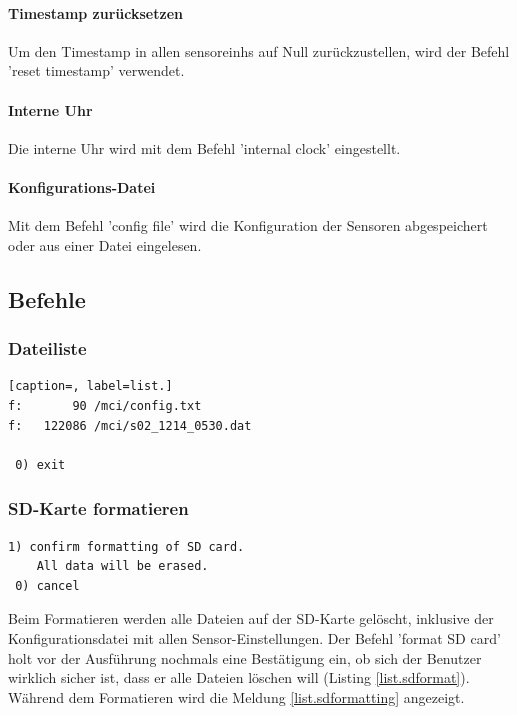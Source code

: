\paragraph{Timestamp zurücksetzen} Um den Timestamp in allen \glspl{sensoreinh} auf Null zurückzustellen, wird der Befehl 'reset timestamp' verwendet.

\paragraph{Interne Uhr} Die interne Uhr wird mit dem Befehl 'internal clock' eingestellt.

\paragraph{Konfigurations-Datei} Mit dem Befehl 'config file' wird die Konfiguration der Sensoren abgespeichert oder aus einer Datei eingelesen.

\subsection{Befehle}\label{ssec.befehle}

\subsubsection{Dateiliste}\label{sssec.listfiles}
\begin{lstlisting}[caption=, label=list.]
f:       90 /mci/config.txt
f:   122086 /mci/s02_1214_0530.dat

 0) exit
\end{lstlisting}


\subsubsection{SD-Karte formatieren}\label{sssec.sdformat}
\begin{lstlisting}[caption=Untermenü SD-Karte formatieren, label=list.sdformat]
 1) confirm formatting of SD card.
    All data will be erased.
 0) cancel
\end{lstlisting}

Beim Formatieren werden alle Dateien auf der SD-Karte gelöscht, inklusive der Konfigurationsdatei mit allen Sensor-Einstellungen. Der Befehl 'format SD card' holt vor der Ausführung nochmals eine Bestätigung ein, ob sich der Benutzer wirklich sicher ist, dass er alle Dateien löschen will (Listing \ref{list.sdformat}). Während dem Formatieren wird die Meldung \ref{list.sdformatting} angezeigt.

